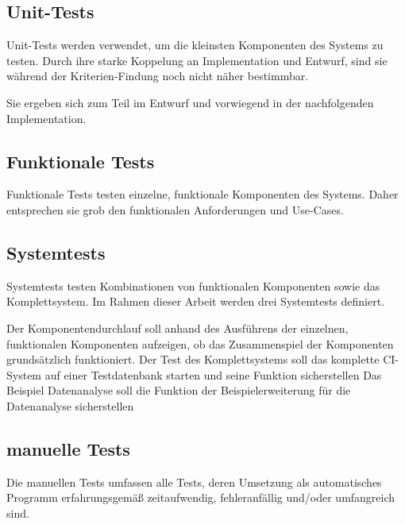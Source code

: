 \subsection{Unit-Tests}

Unit-Tests werden verwendet, um die kleinsten Komponenten des Systems zu testen.
Durch ihre starke Koppelung an Implementation und Entwurf,
sind sie w\"ahrend der Kriterien-Findung noch nicht n\"aher bestimmbar.

Sie ergeben sich zum Teil im Entwurf und vorwiegend in
der nachfolgenden Implementation.

\subsection{Funktionale Tests}

Funktionale Tests testen einzelne, funktionale Komponenten des Systems.
Daher entsprechen sie grob den funktionalen Anforderungen und Use-Cases.

\subsection{Systemtests}

Systemtests testen Kombinationen von funktionalen Komponenten sowie das Komplettsystem.
Im Rahmen dieser Arbeit werden drei Systemtests definiert.


\begin{description}
  \dhitem[Komponentendurchlauf:]
    Der Komponentendurchlauf soll anhand des Ausführens der einzelnen, funktionalen Komponenten aufzeigen,
    ob das Zusammenspiel der Komponenten grunds\"atzlich funktioniert.
  \dhitem[Komplettstystem:]
    Der Test des Komplettsystems soll das komplette CI-System auf einer Testdatenbank starten
    und seine Funktion sicherstellen
    Das Beispiel Datenanalyse soll die Funktion der Beispielerweiterung f\"ur die Datenanalyse sicherstellen
\end{description}

\subsection{manuelle Tests}

Die manuellen Tests umfassen alle Tests,
deren Umsetzung als automatisches Programm erfahrungsgemäß zeitaufwendig,
fehleranf\"allig und/oder umfangreich sind.

